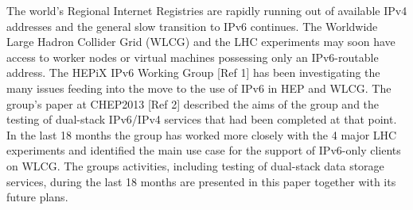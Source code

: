 The world's Regional Internet Registries are rapidly running out of available IPv4 addresses and the 
general slow transition to IPv6 continues. The Worldwide Large Hadron Collider Grid (WLCG) and the LHC experiments 
may soon have access to worker nodes or virtual machines possessing only an IPv6-routable address. The HEPiX
IPv6 Working Group [Ref 1] has been investigating the many issues feeding into the move to the use of IPv6 in HEP and WLCG.
The group's paper at CHEP2013 [Ref 2] described the aims of the group and the testing of dual-stack IPv6/IPv4 
services that had been completed at that point. In the last 18 months the group has worked more closely with the
4 major LHC experiments and identified the main use case for the support of IPv6-only clients on WLCG. The groups
activities, including testing of dual-stack data storage services, during the last 18 months are presented in this 
paper together with its future plans.